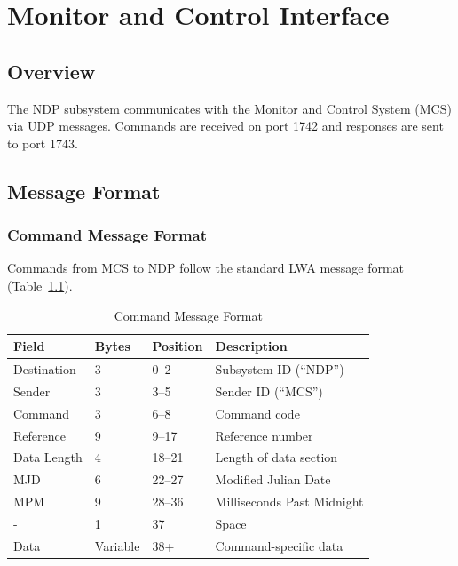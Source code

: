 
\chapter{Monitor and Control Interface}
\label{sec:monitor-control}

\section{Overview}

The NDP subsystem communicates with the Monitor and Control System (MCS) via UDP messages. Commands are received on port 1742 and responses are sent to port 1743.

\section{Message Format}

\subsection{Command Message Format}

Commands from MCS to NDP follow the standard LWA message format (Table~\ref{tab:cmd-format}).

\begin{table}[htbp]
    \centering
    \caption{Command Message Format}
    \label{tab:cmd-format}
    \begin{tabular}{llll}
        \toprule
        \textbf{Field} & \textbf{Bytes} & \textbf{Position} & \textbf{Description} \\
        \midrule
        Destination & 3 & 0--2 & Subsystem ID (``NDP'') \\
        Sender & 3 & 3--5 & Sender ID (``MCS'') \\
        Command & 3 & 6--8 & Command code \\
        Reference & 9 & 9--17 & Reference number \\
        Data Length & 4 & 18--21 & Length of data section \\
        MJD & 6 & 22--27 & Modified Julian Date \\
        MPM & 9 & 28--36 & Milliseconds Past Midnight \\
        - & 1 & 37 & Space \\
        Data & Variable & 38+ & Command-specific data \\
        \bottomrule
    \end{tabular}
\end{table}

